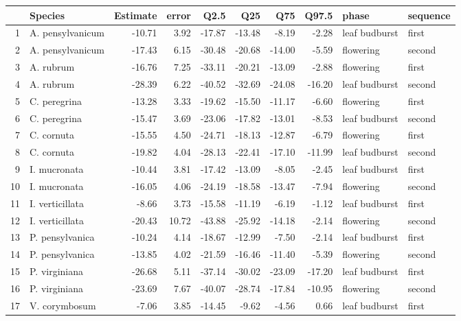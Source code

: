 \documentclass{article}\usepackage[]{graphicx}\usepackage[]{color}
\begin{document}
\begin{table}[ht]
\centering
\begin{tabular}{rlrrrrrrll}
  \hline
 & Species & Estimate & error & Q2.5 & Q25 & Q75 & Q97.5 & phase & sequence \\ 
  \hline
1 & A. pensylvanicum & -10.71 & 3.92 & -17.87 & -13.48 & -8.19 & -2.28 & leaf budburst & first \\ 
  2 & A. pensylvanicum & -17.43 & 6.15 & -30.48 & -20.68 & -14.00 & -5.59 & flowering & second \\ 
  3 & A. rubrum & -16.76 & 7.25 & -33.11 & -20.21 & -13.09 & -2.88 & flowering & first \\ 
  4 & A. rubrum & -28.39 & 6.22 & -40.52 & -32.69 & -24.08 & -16.20 & leaf budburst & second \\ 
  5 & C. peregrina & -13.28 & 3.33 & -19.62 & -15.50 & -11.17 & -6.60 & flowering & first \\ 
  6 & C. peregrina & -15.47 & 3.69 & -23.06 & -17.82 & -13.01 & -8.53 & leaf budburst & second \\ 
  7 & C. cornuta & -15.55 & 4.50 & -24.71 & -18.13 & -12.87 & -6.79 & flowering & first \\ 
  8 & C. cornuta & -19.82 & 4.04 & -28.13 & -22.41 & -17.10 & -11.99 & leaf budburst & second \\ 
  9 & I. mucronata & -10.44 & 3.81 & -17.42 & -13.09 & -8.05 & -2.45 & leaf budburst & first \\ 
  10 & I. mucronata & -16.05 & 4.06 & -24.19 & -18.58 & -13.47 & -7.94 & flowering & second \\ 
  11 & I. verticillata & -8.66 & 3.73 & -15.58 & -11.19 & -6.19 & -1.12 & leaf budburst & first \\ 
  12 & I. verticillata & -20.43 & 10.72 & -43.88 & -25.92 & -14.18 & -2.14 & flowering & second \\ 
  13 & P. pensylvanica & -10.24 & 4.14 & -18.67 & -12.99 & -7.50 & -2.14 & leaf budburst & first \\ 
  14 & P. pensylvanica & -13.85 & 4.02 & -21.59 & -16.46 & -11.40 & -5.39 & flowering & second \\ 
  15 & P. virginiana & -26.68 & 5.11 & -37.14 & -30.02 & -23.09 & -17.20 & leaf budburst & first \\ 
  16 & P. virginiana & -23.69 & 7.67 & -40.07 & -28.74 & -17.84 & -10.95 & flowering & second \\ 
  17 & V. corymbosum & -7.06 & 3.85 & -14.45 & -9.62 & -4.56 & 0.66 & leaf budburst & first \\ 

\end{tabular}
\end{table}
\end{document}
